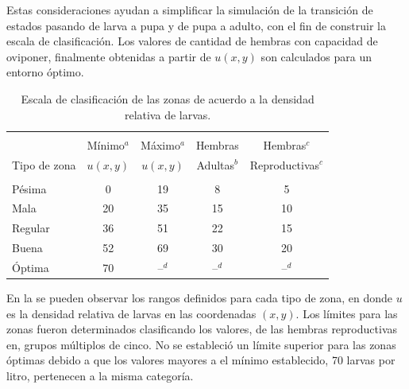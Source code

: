 Estas consideraciones ayudan a simplificar la simulación de la transición de estados pasando de
larva a pupa y de pupa a adulto, con el fin de construir la escala de clasificación. Los valores
de cantidad de hembras con capacidad de oviponer, finalmente obtenidas a partir de $u(x,y)$ son
calculados para un entorno óptimo.


\begin{table}[!hptb]
    \begin{minipage}{\textwidth}
\begin{center}
    \caption{\label{tab:cap4-puntaje-zona} Escala de clasificación de las zonas de acuerdo a la densidad relativa de larvas.}
    \begin{tabular}{p{3cm} c c c c}
        \hline \\
                     & Mínimo$^a$ & Máximo$^a$ & Hembras     & Hembras$^c$ \\
        Tipo de zona & $u(x,y)$   & $u(x,y)$   & Adultas$^b$ & Reproductivas$^c$ \\
        \hline
        \hline\\
        Pésima  & 0  & 19 & 8  & 5 \\
        Mala    & 20 & 35 & 15 & 10\\
        Regular & 36 & 51 & 22 & 15\\
        Buena   & 52 & 69 & 30 & 20\\
        Óptima  & 70 & --$^d$ & --$^d$ & --$^d$\\
    \end{tabular}
\end{center}
    \end{minipage}
\end{table}

En la  se pueden observar los rangos definidos para cada tipo de
zona, en donde $u$ es la densidad relativa de larvas en las coordenadas $(x,y)$. Los límites para
las zonas fueron determinados clasificando los valores, de las hembras reproductivas en, grupos
múltiplos de cinco. No se estableció un límite superior para las zonas óptimas debido a que los
valores mayores a el mínimo establecido, 70 larvas por litro, pertenecen a la misma categoría.
